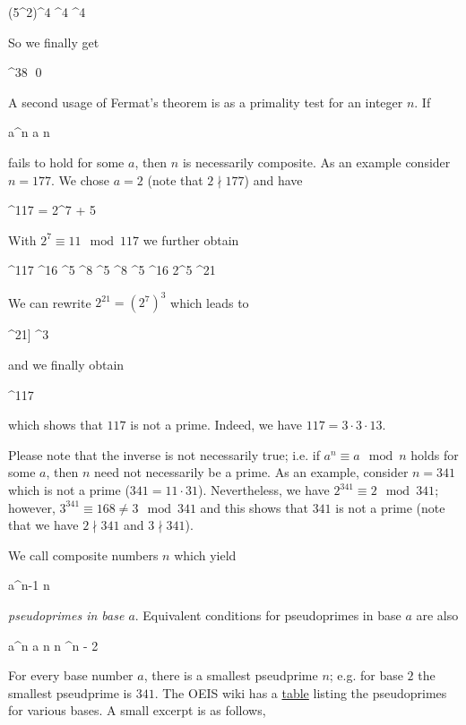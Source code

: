 \bee
(5^2)^4 ^4 ^4   
\eee

So we finally get

^{38}     \qed
\eee

A second usage of Fermat's theorem is as a primality test for an integer $n$. If

\bee
a^n \equiv a \mod n
\eee

fails to hold for some $a$, then $n$ is necessarily composite. As an example consider $n = 177$. We chose $a = 2$ (note that $2 \nmid 177$)  and have

^{117} = 2^{7  + 5}
\eee

With $2^7 \equiv 11 \mod 117$ we further obtain

^{117} ^{16} ^5 ^8 ^5 ^8 ^5 ^{16} 2^5 ^{21} 
\eee

We can rewrite $2^{21} = (2^7)^3$ which leads to

^{21]} ^3      
\eee

and we finally obtain

^{117}    
\eee

which shows that $117$ is not a prime. Indeed, we have $117 = 3 \cdot 3 \cdot 13$.

Please note that the inverse is not necessarily true; i.e. if $a^{n} \equiv a \mod n$ holds for some $a$, then $n$ need not necessarily be a prime. As an example, consider $n = 341$ which is not a prime ($341 = 11 \cdot 31$). Nevertheless, we have $2^{341} \equiv 2 \mod 341$; however, $3^{341} \equiv 168 \neq 3 \mod 341$ and this shows that $341$ is not a prime (note that we have $2 \nmid 341$ and $3 \nmid 341$).

We call composite numbers $n$ which yield

\bee
a^{n-1}  \mod n
\eee

\emph{pseudoprimes in base $a$}. Equivalent conditions for pseudoprimes in base $a$ are also

\bee
a^n \equiv a \mod n \leftrightarrow n ^n - 2
\eee

For every base number $a$, there is a smallest pseudprime $n$; e.g. for base $2$ the smallest pseudprime is $341$. The OEIS wiki has a \href{https://oeis.org/wiki/Table_of_Fermat_pseudoprimes}{table} listing the pseudoprimes for various bases. A small excerpt is as follows,


